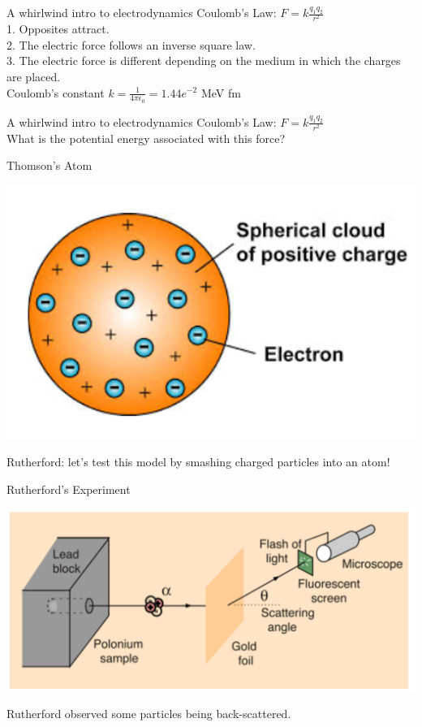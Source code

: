  \begin{frame}{A whirlwind intro to electrodynamics}
\small
Coulomb's Law: $F = k \frac{q_1 q_2}{r^2}$\\[4ex]
1. Opposites attract.\\[2ex]
2. The electric force follows an inverse square law.\\[2ex]
3. The electric force is different depending on the medium in which the charges are placed.\\[2ex]
Coulomb's constant $k = \frac{1}{4\pi \epsilon_0} = 1.44 e^{-2}$ MeV fm\\[1ex]

\end{frame}


 \begin{frame}{A whirlwind intro to electrodynamics}
\small
Coulomb's Law: $F = k \frac{q_1 q_2}{r^2}$\\[4ex]
What is the potential energy associated with this force?\\[25ex]


\end{frame}


 \begin{frame}{Thomson's Atom}
\small


\includegraphics[scale=0.4]{thomson}

Rutherford: let's test this model by smashing charged particles into an atom!
\end{frame}


 \begin{frame}{Rutherford's Experiment}
\small


\includegraphics[scale=0.4]{ruthexp}

Rutherford observed some particles being back-scattered.
\end{frame}


